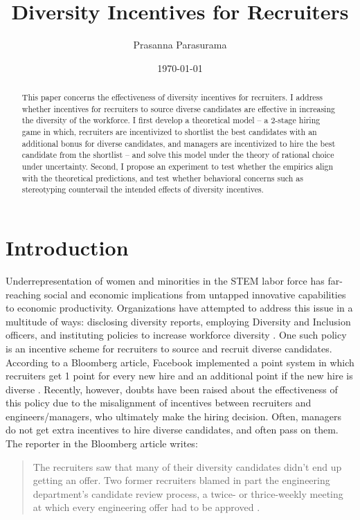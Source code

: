 \documentclass[11pt]{article}
\begin{document}
\title{Diversity Incentives for Recruiters}
\author{Prasanna Parasurama}
\date{\today}
\maketitle

\begin{abstract}
    This paper concerns the effectiveness of diversity incentives for recruiters. I address whether incentives for recruiters to source diverse candidates are effective in increasing the diversity of the workforce. I first develop a theoretical model --  a 2-stage hiring game in which, recruiters are incentivized to shortlist the best candidates with an additional bonus for diverse candidates, and managers are incentivized to hire the best candidate from the shortlist -- and solve this model under the theory of rational choice under uncertainty. Second, I propose an experiment to test whether the empirics align with the theoretical predictions, and test whether behavioral concerns such as stereotyping countervail the intended effects of diversity incentives.
\end{abstract}

\section{Introduction}
Underrepresentation of women and minorities in the STEM labor force has far-reaching social and economic implications from untapped innovative capabilities to economic productivity. Organizations have attempted to address this issue in a multitude of ways: disclosing diversity reports, employing Diversity and Inclusion officers, and instituting policies to increase workforce diversity \parencite{shi_adoption_2018}. One such policy is an incentive scheme for recruiters to source and recruit diverse candidates. According to a Bloomberg article, Facebook implemented a point system in which recruiters get 1 point for every new hire and an additional point if the new hire is diverse \parencite{huet_facebooks_2017}. Recently, however, doubts have been raised about the effectiveness of this policy due to the misalignment of incentives between recruiters and engineers/managers, who ultimately make the hiring decision. Often, managers do not get extra incentives to hire diverse candidates, and often pass on them. The reporter in the Bloomberg article writes:
\begin{quote}
    The recruiters saw that many of their diversity candidates didn’t end up getting an offer. Two former recruiters blamed in part the engineering department’s candidate review process, a twice- or thrice-weekly meeting at which every engineering offer had to be approved \parencite{huet_facebooks_2017}.
\end{quote}
\end{document}
